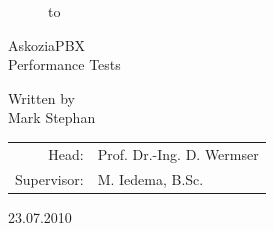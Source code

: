 \begin{titlepage}
\begin{figure}
  \begin{center}
    \hbox to 
  \end{center}
\end{figure}

\begin{center}
\rule{0pt}{0pt}
\vfill
\vfill

\begin{huge}
AskoziaPBX\\[0.75ex]
Performance Tests\\[0.75ex]
\end{huge}

\vfill
\vfill
\vfill
\vfill
Written by\\
\vspace*{.5cm}
Mark Stephan\\
\vspace{.5cm}

\vfill
\vfill
\vfill
\vfill
\vfill
\vfill
\vfill

\begin{tabular}{rl}
Head:    & Prof. Dr.-Ing. D. Wermser\\
Supervisor:   & M. Iedema, B.Sc.\\
\end{tabular}
\end{center}
23.07.2010
\end{titlepage}
